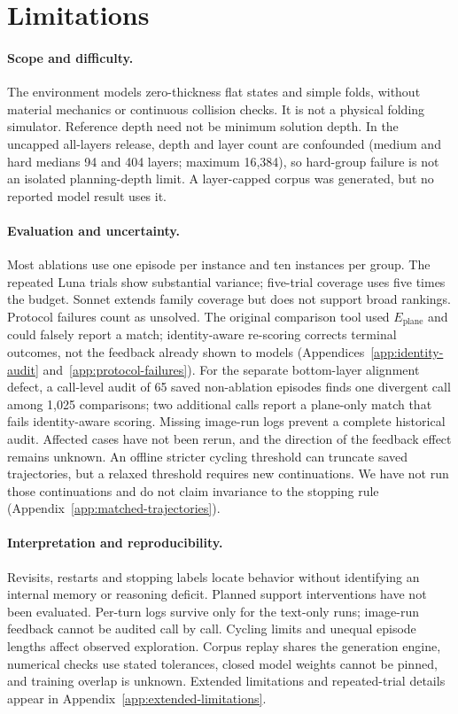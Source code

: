\section{Limitations}
\label{sec:limitations}
\paragraph{Scope and difficulty.}
The environment models zero-thickness flat states and simple folds, without material
mechanics or continuous collision checks. It is not a physical folding simulator.
Reference depth need not be minimum solution depth. In the uncapped all-layers release,
depth and layer count are confounded (medium and hard medians 94 and 404 layers;
maximum 16,384), so hard-group failure is not an isolated planning-depth limit.
A layer-capped corpus was generated, but no reported model result uses it.

\paragraph{Evaluation and uncertainty.}
Most ablations use one episode per instance and ten instances per group. The repeated
Luna trials show substantial variance; five-trial coverage uses five times the budget.
Sonnet extends family coverage but does not support broad rankings. Protocol failures
count as unsolved. The original comparison tool used $E_{\mathrm{plane}}$ and could
falsely report a match; identity-aware re-scoring corrects terminal outcomes, not the
feedback already shown to models (Appendices~\ref{app:identity-audit}
and~\ref{app:protocol-failures}).
For the separate bottom-layer alignment defect, a call-level audit of 65 saved
non-ablation episodes finds one divergent call among 1,025 comparisons; two additional
calls report a plane-only match that fails identity-aware scoring. Missing image-run
logs prevent a complete historical audit. Affected cases have not been rerun, and
the direction of the feedback effect remains unknown.
An offline stricter cycling threshold can truncate saved trajectories, but a relaxed
threshold requires new continuations. We have not run those continuations and do not
claim invariance to the stopping rule (Appendix~\ref{app:matched-trajectories}).

\paragraph{Interpretation and reproducibility.}
Revisits, restarts and stopping labels locate behavior without identifying an internal
memory or reasoning deficit. Planned support interventions have not been evaluated.
Per-turn logs survive only for the text-only runs; image-run feedback cannot be audited
call by call. Cycling limits and unequal episode lengths affect observed exploration.
Corpus replay shares the generation engine, numerical checks use stated tolerances,
closed model weights cannot be pinned, and training overlap is unknown. Extended
limitations and repeated-trial details appear in Appendix~\ref{app:extended-limitations}.
